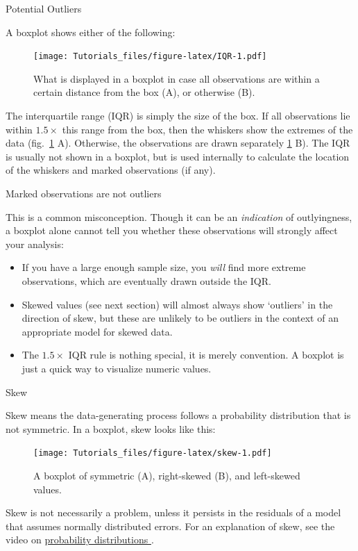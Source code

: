 \documentclass[
]{book}
\providecommand{\tightlist}{%
  \setlength{\itemsep}{0pt}\setlength{\parskip}{0pt}}
\begin{document}
Potential Outliers

A boxplot shows either of the following:

\begin{figure}
\centering
\texttt{[image: Tutorials\_files/figure-latex/IQR-1.pdf]}
\caption{\label{fig:IQR}What is displayed in a boxplot in case all observations are within a certain distance from the box (A), or otherwise (B).}
\end{figure}

The interquartile range (IQR) is simply the size of the box. If all observations lie within \(1.5\times\) this range from the box, then the whiskers show the extremes of the data (fig.~\ref{fig:IQR} A). Otherwise, the observations are drawn separately \ref{fig:IQR} B). The IQR is usually not shown in a boxplot, but is used internally to calculate the location of the whiskers and marked observations (if any).

Marked observations are not outliers

This is a common misconception. Though it can be an \emph{indication} of outlyingness, a boxplot alone cannot tell you whether these observations will strongly affect your analysis:

\begin{itemize}
\tightlist
\item
  If you have a large enough sample size, you \emph{will} find more extreme observations, which are eventually drawn outside the IQR.
\item
  Skewed values (see next section) will almost always show `outliers' in the direction of skew, but these are unlikely to be outliers in the context of an appropriate model for skewed data.
\item
  The \(1.5\times\) IQR rule is nothing special, it is merely convention. A boxplot is just a quick way to visualize numeric values.
\end{itemize}

Skew

Skew means the data-generating process follows a probability distribution that is not symmetric. In a boxplot, skew looks like this:

\begin{figure}
\centering
\texttt{[image: Tutorials\_files/figure-latex/skew-1.pdf]}
\caption{\label{fig:skew}A boxplot of symmetric (A), right-skewed (B), and left-skewed values.}
\end{figure}

Skew is not necessarily a problem, unless it persists in the residuals of a model that assumes normally distributed errors. For an explanation of skew, see the video on \href{https://youtu.be/jdfG7rKPVNk}{probability distributions }.
\end{document}
